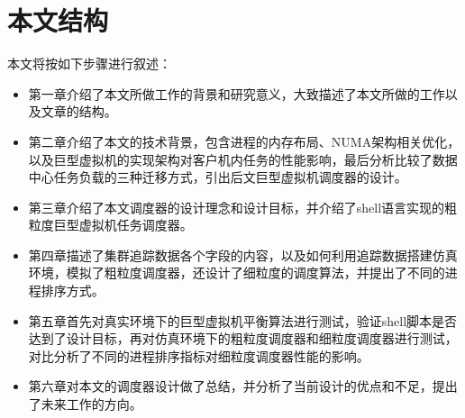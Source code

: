 \section{本文结构}
本文将按如下步骤进行叙述：
\begin{itemize}
  \item 第一章介绍了本文所做工作的背景和研究意义，大致描述了本文所做的工作以及文章的结构。
  \item 第二章介绍了本文的技术背景，包含进程的内存布局、NUMA架构相关优化，以及巨型虚拟机的实现架构对客户机内任务的性能影响，最后分析比较了数据中心任务负载的三种迁移方式，引出后文巨型虚拟机调度器的设计。
  \item 第三章介绍了本文调度器的设计理念和设计目标，并介绍了shell语言实现的粗粒度巨型虚拟机任务调度器。
  \item 第四章描述了集群追踪数据各个字段的内容，以及如何利用追踪数据搭建仿真环境，模拟了粗粒度调度器，还设计了细粒度的调度算法，并提出了不同的进程排序方式。
  \item 第五章首先对真实环境下的巨型虚拟机平衡算法进行测试，验证shell脚本是否达到了设计目标，再对仿真环境下的粗粒度调度器和细粒度调度器进行测试，对比分析了不同的进程排序指标对细粒度调度器性能的影响。
  \item 第六章对本文的调度器设计做了总结，并分析了当前设计的优点和不足，提出了未来工作的方向。
\end{itemize}
